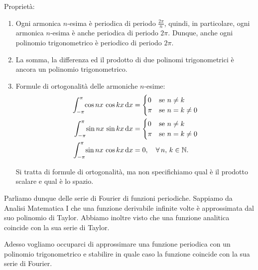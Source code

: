 \documentclass[../../analisi2]{subfiles}
\begin{document}
        Proprietà:
        \begin{enumerate}
            \item Ogni armonica \(n\)-esima è periodica di periodo \(\frac{2 \pi}{n}\), quindi, in particolare, ogni armonica \(n\)-esima
                è anche periodica di periodo \(2\pi\). Dunque, anche ogni polinomio trigonometrico è periodico di periodo \(2\pi\).
            \item La somma, la differenza ed il prodotto di due polinomi trigonometrici è ancora un polinomio trigonometrico.
            \item Formule di ortogonalità delle armoniche \(n\)-esime:
                \begin{align*}
                    \int_{-\pi}^{\pi} \! \cos nx \, \cos kx \, \mathrm{d}x &=
                        \begin{cases}
                            0 & \text{se } n \neq k\\
                            \pi & \text{se } n = k \neq 0
                        \end{cases}\\
                    \int_{-\pi}^{\pi} \! \sin nx \, \sin kx \, \mathrm{d}x &=
                        \begin{cases}
                            0 & \text{se } n \neq k\\
                            \pi & \text{se } n = k \neq 0
                        \end{cases}\\
                    \int_{-\pi}^{\pi} \! \sin nx \, \cos kx \, \mathrm{d}x &= 0, \quad \forall \, n, \, k \in \mathbb{N}.
                \end{align*}
                \begin{osservazione}
                    Si tratta di formule di ortogonalità, ma non specifichiamo qual è il prodotto scalare e qual è lo spazio.
                \end{osservazione}
        \end{enumerate}

        Parliamo dunque delle serie di Fourier di funzioni periodiche. Sappiamo da Analisi Matematica I che una funzione derivabile
        infinite volte è approssimata dal suo polinomio di Taylor. Abbiamo inoltre visto che una funzione analitica coincide con la sua
        serie di Taylor.

        Adesso vogliamo occuparci di approssimare una funzione periodica con un polinomio trigonometrico e stabilire in quale caso la
        funzione coincide con la sua serie di Fourier.
\end{document}
